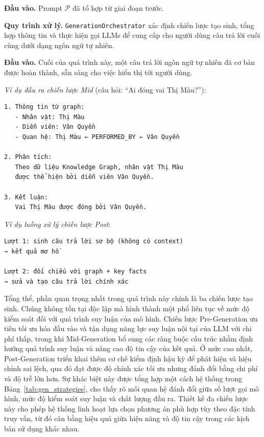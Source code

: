 \textbf{Đầu vào.} Prompt $\mathcal{P}$ đã tổ hợp từ giai đoạn trước.

\textbf{Quy trình xử lý.} \texttt{GenerationOrchestrator} xác định chiến lược tạo sinh, tổng hợp thông tin và thực hiện gọi LLMs để cung cấp cho người dùng câu trả lời cuối cùng dưới dạng ngôn ngữ tự nhiên.

\textbf{Đầu vào.} Cuối của quá trình này, một câu trả lời ngôn ngữ tự nhiên đã cơ bản được hoàn thành, sẵn sàng cho việc hiển thị tới người dùng.

\vspace{0.5em}
\noindent \textit{Ví dụ đầu ra chiến lược Mid} (câu hỏi: ``Ai đóng vai Thị Màu?''):
\begin{tcolorbox}[colback=gray!5, colframe=black!50, arc=4pt, boxrule=0.5pt]
{\small
\begin{verbatim}
1. Thông tin từ graph:
   - Nhân vật: Thị Màu
   - Diễn viên: Vân Quyền
   - Quan hệ: Thị Màu ← PERFORMED_BY ← Vân Quyền

2. Phân tích:
   Theo dữ liệu Knowledge Graph, nhân vật Thị Màu
   được thể hiện bởi diễn viên Vân Quyền.

3. Kết luận:
   Vai Thị Màu được đóng bởi Vân Quyền.
\end{verbatim}
}
\end{tcolorbox}



\vspace{0.5em}
\noindent \textit{Ví dụ luồng xử lý chiến lược Post}:
\begin{tcolorbox}[colback=gray!5, colframe=black!50, arc=4pt, boxrule=0.5pt]
{\small
\begin{verbatim}
Lượt 1: sinh câu trả lời sơ bộ (không có context)
→ kết quả mơ hồ

Lượt 2: đối chiếu với graph + key facts
→ sửa và tạo câu trả lời chính xác
\end{verbatim}
}
\end{tcolorbox}

Tổng thể, phần quan trọng nhất trong quá trình này chính là ba chiến lược tạo sinh. Chúng không tồn tại độc lập mà hình thành một phổ liên tục về mức độ kiểm soát đối với quá trình suy luận của mô hình. Chiến lược Pre-Generation ưu tiên tối ưu hóa đầu vào và tận dụng năng lực suy luận nội tại của LLM với chi phí thấp, trong khi Mid-Generation bổ sung các ràng buộc cấu trúc nhằm định hướng quá trình suy luận và nâng cao độ tin cậy của kết quả. Ở mức cao nhất, Post-Generation triển khai thêm cơ chế kiểm định hậu kỳ để phát hiện và hiệu chỉnh sai lệch, qua đó đạt được độ chính xác tối ưu nhưng đánh đổi bằng chi phí và độ trễ lớn hơn. Sự khác biệt này được tổng hợp một cách hệ thống trong Bảng~\ref{tab:gen_strategies}, cho thấy rõ mối quan hệ đánh đổi giữa số lượt gọi mô hình, mức độ kiểm soát suy luận và chất lượng đầu ra. Thiết kế đa chiến lược này cho phép hệ thống linh hoạt lựa chọn phương án phù hợp tùy theo đặc tính truy vấn, từ đó cân bằng hiệu quả giữa hiệu năng và độ tin cậy trong các kịch bản sử dụng khác nhau.

